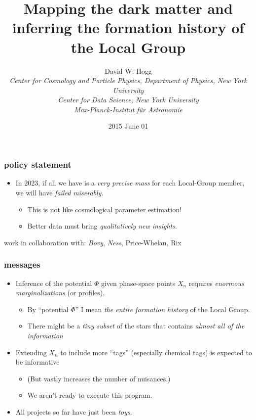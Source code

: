 \documentclass[pdftex]{beamer}
\title{Mapping the dark matter and inferring the formation history of the Local Group}
\author[David W. Hogg (NYU)]{David W. Hogg \\
  \textsl{\footnotesize Center for Cosmology and Particle Physics, Department of Physics,
                 New York University}\\
  \textsl{\footnotesize Center for Data Science,
                 New York University}\\
  \textsl{\footnotesize Max-Planck-Institut f\"ur Astronomie}}
\date{2015 June 01}
\begin{document}
\begin{frame}
  \frametitle{policy statement}
  \begin{itemize}
  \item In 2023, if all we have is a \emph{very precise mass} for
    each Local-Group member, we will have \emph{failed miserably}.
    \begin{itemize}
    \item This is not like cosmological parameter estimation!
    \item Better data must bring \emph{qualitatively new insights}.
    \end{itemize}
  \end{itemize}
\end{frame}

\begin{frame}
  \titlepage
  {\footnotesize work in collaboration with: \emph{Bovy}, \emph{Ness}, Price-Whelan, Rix}
\end{frame}

\newcommand{\messages}{%
\begin{frame}
  \frametitle{messages}
  \begin{itemize}
  \item Inference of the potential $\Phi$ given phase-space points
    $X_n$ requires \emph{enormous marginalizations} (or profiles).
    \begin{itemize}
    \item By ``potential $\Phi$'' I mean \emph{the entire formation history}
      of the Local Group.
    \item There might be a \emph{tiny subset} of the stars that contains
      \emph{almost all of the information}
    \end{itemize}
  \item Extending $X_n$ to include more ``tags'' (especially chemical
    tags) is expected to be informative
    \begin{itemize}
    \item (But vastly increases the number of nuisances.)
    \item We aren't ready to execute this program.
    \end{itemize}
  \item All projects so far have just been \emph{toys}.
  \end{itemize}
\end{frame}}

\messages
\end{document}
